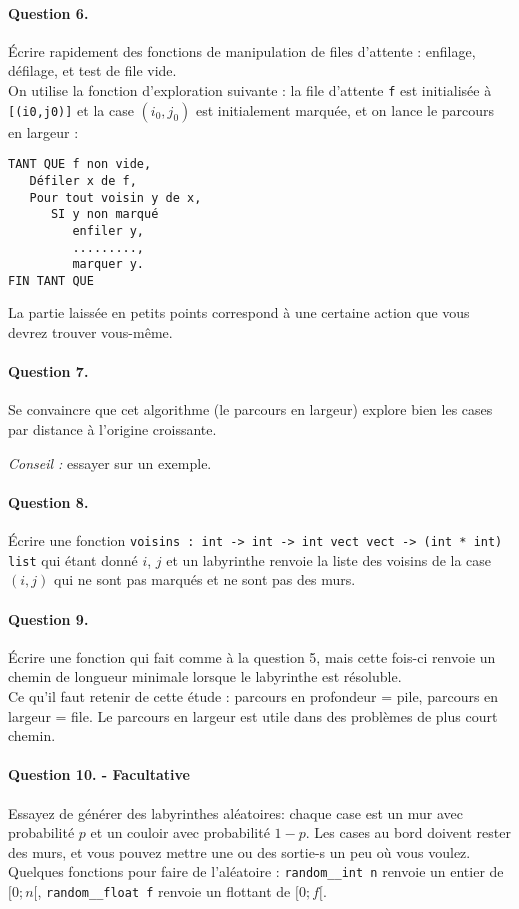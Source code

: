 \documentclass[10pt,a4paper]{article}
\begin{document}
\paragraph{Question 6.} Écrire rapidement des fonctions de manipulation de files
d'attente : enfilage, défilage, et test de file vide.
\\

On utilise la fonction d'exploration suivante : la file d'attente \texttt{f} est
initialisée à \texttt{[(i0,j0)]} et la case $(i_0, j_0)$ est initialement
marquée, et on lance le parcours en largeur :
\begin{verbatim}TANT QUE f non vide,
   Défiler x de f,
   Pour tout voisin y de x,
      SI y non marqué
         enfiler y,
         .........,
         marquer y.
FIN TANT QUE
\end{verbatim}
La partie laissée en petits points correspond à une certaine action que vous
devrez trouver vous-même.

\paragraph{Question 7.} Se convaincre que cet algorithme (le parcours en largeur)
explore bien les cases par distance à l'origine croissante.

\textit{Conseil :} essayer sur un exemple.

\paragraph{Question 8.} Écrire une fonction \texttt{voisins : int -> int -> int vect vect -> (int * int) list} qui étant donné $i$, $j$ et un labyrinthe renvoie la liste
des voisins de la case $(i,j)$ qui ne sont pas marqués et ne sont pas des murs.

\paragraph{Question 9.} Écrire une fonction qui fait comme à la question 5, mais
cette fois-ci renvoie un chemin de longueur minimale lorsque le labyrinthe est
résoluble.
\\

Ce qu'il faut retenir de cette étude : parcours en profondeur = pile, parcours en
largeur = file. Le parcours en largeur est utile dans des problèmes de plus court chemin.
\paragraph{Question 10. - Facultative}
Essayez de générer des labyrinthes aléatoires: chaque case est un mur avec 
probabilité $p$ et un couloir avec probabilité $1-p$. Les cases au bord doivent 
rester des murs, et vous pouvez mettre une ou des sortie-s un peu où vous voulez. 
Quelques fonctions pour faire de l'aléatoire : \texttt{random\_\_int n} renvoie un 
entier de $[0;n[$, \texttt{random\_\_float f} renvoie un flottant de $[0;f[$.
\end{document}
